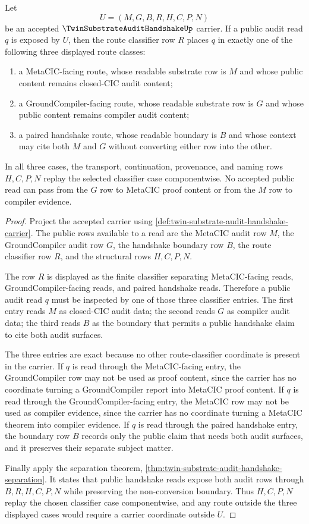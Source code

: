 \begin{theorem}
\label{thm:twin-substrate-audit-handshake-route-classifier-trichotomy}
Let
$$
U=(M,G,B,R,H,C,P,N)
$$
be an accepted $\TwinSubstrateAuditHandshakeUp$ carrier. If a public audit read $q$ is exposed by $U$, then the route classifier row $R$ places $q$ in exactly one of the following three displayed route classes:
\begin{enumerate}
\item a MetaCIC-facing route, whose readable substrate row is $M$ and whose public content remains closed-CIC audit content;
\item a GroundCompiler-facing route, whose readable substrate row is $G$ and whose public content remains compiler audit content;
\item a paired handshake route, whose readable boundary is $B$ and whose context may cite both $M$ and $G$ without converting either row into the other.
\end{enumerate}
In all three cases, the transport, continuation, provenance, and naming rows $H,C,P,N$ replay the selected classifier case componentwise. No accepted public read can pass from the $G$ row to MetaCIC proof content or from the $M$ row to compiler evidence.
\end{theorem}
\begin{proof}
Project the accepted carrier using \autoref{def:twin-substrate-audit-handshake-carrier}. The public rows available to a read are the MetaCIC audit row $M$, the GroundCompiler audit row $G$, the handshake boundary row $B$, the route classifier row $R$, and the structural rows $H,C,P,N$.

The row $R$ is displayed as the finite classifier separating MetaCIC-facing reads, GroundCompiler-facing reads, and paired handshake reads. Therefore a public audit read $q$ must be inspected by one of those three classifier entries. The first entry reads $M$ as closed-CIC audit data; the second reads $G$ as compiler audit data; the third reads $B$ as the boundary that permits a public handshake claim to cite both audit surfaces.

The three entries are exact because no other route-classifier coordinate is present in the carrier. If $q$ is read through the MetaCIC-facing entry, the GroundCompiler row may not be used as proof content, since the carrier has no coordinate turning a GroundCompiler report into MetaCIC proof content. If $q$ is read through the GroundCompiler-facing entry, the MetaCIC row may not be used as compiler evidence, since the carrier has no coordinate turning a MetaCIC theorem into compiler evidence. If $q$ is read through the paired handshake entry, the boundary row $B$ records only the public claim that needs both audit surfaces, and it preserves their separate subject matter.

Finally apply the separation theorem, \autoref{thm:twin-substrate-audit-handshake-separation}. It states that public handshake reads expose both audit rows through $B,R,H,C,P,N$ while preserving the non-conversion boundary. Thus $H,C,P,N$ replay the chosen classifier case componentwise, and any route outside the three displayed cases would require a carrier coordinate outside $U$.
\end{proof}
